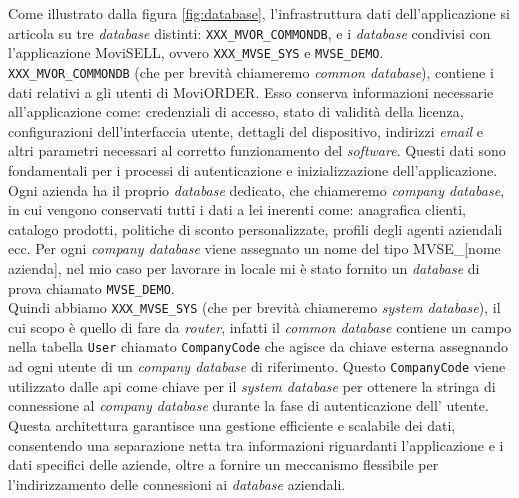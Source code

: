 Come illustrato dalla figura \ref{fig:database}, l'infrastruttura dati dell'applicazione {\movi} si articola su tre 
\textit{database} distinti: \texttt{XXX\_MVOR\_COMMONDB}, e i \textit{database} condivisi con l'applicazione 
MoviSELL, ovvero \texttt{XXX\_MVSE\_SYS} e \texttt{MVSE\_DEMO}.\\
\texttt{XXX\_MVOR\_COMMONDB} (che per brevità chiameremo \textit{common database}), contiene i dati relativi a gli utenti di MoviORDER. 
Esso conserva informazioni necessarie all'applicazione come: credenziali di accesso, stato di validità della licenza, 
configurazioni dell'interfaccia utente, dettagli del dispositivo, indirizzi \textit{email} e altri parametri necessari al corretto 
funzionamento del \textit{software}. Questi dati sono fondamentali per i processi di autenticazione e inizializzazione 
dell'applicazione.\\
Ogni azienda ha il proprio \textit{database} dedicato, che chiameremo \textit{company database}, in cui vengono conservati tutti i dati 
a lei inerenti come: anagrafica clienti, catalogo prodotti, politiche di sconto personalizzate, profili degli agenti 
aziendali ecc. Per ogni \textit{company database} viene assegnato un nome del tipo MVSE\_[nome azienda], nel mio caso per lavorare 
in locale mi è stato fornito un \textit{database} di prova chiamato \texttt{MVSE\_DEMO}.\\
Quindi abbiamo \texttt{XXX\_MVSE\_SYS} (che per brevità chiameremo \textit{system database}), il cui scopo è quello di fare da 
\textit{router}, infatti il \textit{common database} contiene un campo nella tabella \texttt{User} chiamato 
\texttt{CompanyCode} che agisce da chiave esterna assegnando ad ogni utente di {\movi} 
un \textit{company database} di riferimento. Questo \texttt{CompanyCode} viene utilizzato dalle \gls{api} come chiave per il 
\textit{system database} per ottenere la stringa di connessione al \textit{company database} durante la fase di autenticazione dell'
utente.\\
Questa architettura garantisce una gestione efficiente e scalabile dei dati, consentendo una separazione netta tra informazioni 
riguardanti l'applicazione e i dati specifici delle aziende, oltre a fornire un meccanismo flessibile per l'indirizzamento 
delle connessioni ai \textit{database} aziendali.